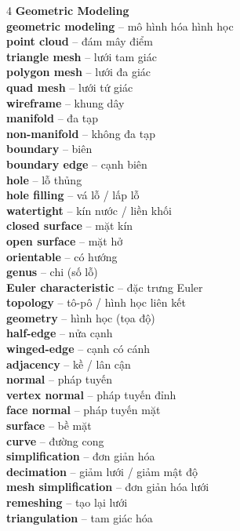 \begin{multicols}{4}
\textbf{Geometric Modeling}\\
\textbf{geometric modeling} -- mô hình hóa hình học\\
\textbf{point cloud} -- đám mây điểm\\
\textbf{triangle mesh} -- lưới tam giác\\
\textbf{polygon mesh} -- lưới đa giác\\
\textbf{quad mesh} -- lưới tứ giác\\
\textbf{wireframe} -- khung dây\\
\textbf{manifold} -- đa tạp\\
\textbf{non-manifold} -- không đa tạp\\
\textbf{boundary} -- biên\\
\textbf{boundary edge} -- cạnh biên\\
\textbf{hole} -- lỗ thủng\\
\textbf{hole filling} -- vá lỗ / lấp lỗ\\
\textbf{watertight} -- kín nước / liền khối\\
\textbf{closed surface} -- mặt kín\\
\textbf{open surface} -- mặt hở\\
\textbf{orientable} -- có hướng\\
\textbf{genus} -- chi (số lỗ)\\
\textbf{Euler characteristic} -- đặc trưng Euler\\
\textbf{topology} -- tô-pô / hình học liên kết\\
\textbf{geometry} -- hình học (tọa độ)\\
\textbf{half-edge} -- nửa cạnh\\
\textbf{winged-edge} -- cạnh có cánh\\
\textbf{adjacency} -- kề / lân cận\\
\textbf{normal} -- pháp tuyến\\
\textbf{vertex normal} -- pháp tuyến đỉnh\\
\textbf{face normal} -- pháp tuyến mặt\\
\textbf{surface} -- bề mặt\\
\textbf{curve} -- đường cong\\
\textbf{simplification} -- đơn giản hóa\\
\textbf{decimation} -- giảm lưới / giảm mật độ\\
\textbf{mesh simplification} -- đơn giản hóa lưới\\
\textbf{remeshing} -- tạo lại lưới\\
\textbf{triangulation} -- tam giác hóa\\

\end{multicols}
